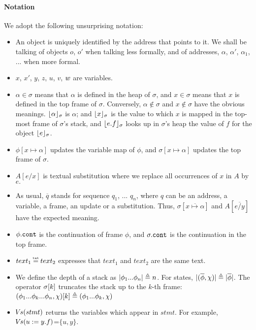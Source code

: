 {\paragraph{Notation} We adopt the following unsurprising notation:
\label{s:notation}
\begin{itemize}
\item
{An object is uniquely identified by the address that points to it. We shall be talking of objects $o$, $o'$ when talking less formally, and of addresses, $\alpha$, $\alpha'$, $\alpha_1$, ...  when more formal.}
\item
$x$, $x'$, $y$, $z$, $u$, $v$, $w$  are {variables}. 
\item
$\alpha \in \sigma$ means that $\alpha$ is defined in the heap of $\sigma$, and $x\in \sigma$ means that $x$ is defined in the top frame of $\sigma$.
Conversely,  $\alpha\notin\sigma$ and $x\notin\sigma$ %
 have the obvious meanings.
$\lfloor \alpha \rfloor_{\sigma}$  is $\alpha$; and $\lfloor x \rfloor_{\sigma}$  is the value to which  $x$  is mapped in the top-most frame of $\sigma$'s stack, 
and $\lfloor e.f \rfloor_{\sigma}$ looks up in $\sigma$'s heap the value of $f$ for the object  $\lfloor e \rfloor_{\sigma}$.
\item %
$\phi[x \mapsto \alpha]$ updates  the variable map  of $\phi$,  
and  $\sigma[x \mapsto \alpha]$ updates the top frame of $\sigma$.
\item
$A[e/x]$ is textual substitution where we replace all occurrences of $x$ in $A$ by $e.$ 
\item
As usual, $\overline q$ stands for  sequence $q_1$, ... $q_n$, where $q$ can be an address, a variable,    a frame, an update or a substitution.
Thus,   $\sigma[\overline{x \mapsto \alpha}]$ and $A[ \overline{e/y}]$ 
have the expected meaning.
\item
$\phi.\mbox{\normalfont{\texttt{cont}}}$ is the continuation of frame $\phi$, and  $\sigma.\mbox{\normalfont{\texttt{cont}}}$ is the continuation in the top frame.
\item
$text_1 \txteq text_2$ expresses that $text_1$ and $text_2$ are  the same text.%
\item
We define the depth of a stack as $|\phi_1...\phi_n| \triangleq n$. For states, $|(\overline \phi, \chi)| \triangleq  |\overline \phi|$.
The  operator $\sigma[k]$ truncates the stack up to the $k$-th frame: %
 $(\phi_1...\phi_k...\phi_n,\chi)[k]  \triangleq   (\phi_1...\phi_k,\chi)$
\item
{ ${\hspace{-1pt}V\hspace{-1pt}}s(stmt)$ returns the variables which appear in $stmt$. For example, ${\hspace{-1pt}V\hspace{-1pt}}s(u:=y.f)$=$\{u,y\}$.}
\end{itemize}

}
